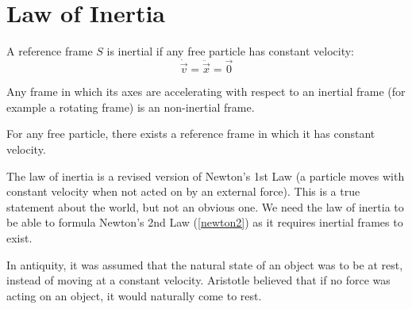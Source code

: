 \documentclass[../main.tex]{subfiles}
\begin{document}
\section{Law of Inertia}
\begin{definition}
  A reference frame $S$ is inertial if any free particle has constant velocity:
  \[
    \dot{\vec{v}} = \ddot{\vec{x}} = \vec{0}
  \]
\end{definition}
\begin{remark}
  Any frame in which its axes are accelerating with respect to an inertial frame (for example a rotating frame) is an non-inertial frame.
\end{remark}
\begin{law}
  For any free particle, there exists a reference frame in which it has constant velocity.
\end{law}
The law of inertia is a revised version of Newton's 1st Law (a particle moves with constant velocity when not acted on by an external force).
This is a true statement about the world, but not an obvious one.
We need the law of inertia to be able to formula Newton's 2nd Law (\cref{newton2}) as it requires inertial frames to exist.
\begin{remark}
  In antiquity, it was assumed that the natural state of an object was to be at rest, instead of moving at a constant velocity.
  Aristotle believed that if no force was acting on an object, it would naturally come to rest.
\end{remark}
\end{document}
